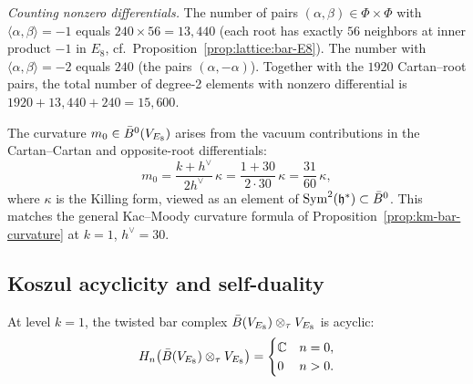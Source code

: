 \begin{computation}
\emph{Counting nonzero differentials.}
The number of pairs $(\alpha, \beta) \in \Phi \times \Phi$ with
$\langle \alpha, \beta \rangle = -1$ equals $240 \times 56 = 13{,}440$
(each root has exactly $56$ neighbors at inner product $-1$ in $E_8$,
cf.\ Proposition~\ref{prop:lattice:bar-E8}).
The number with $\langle \alpha, \beta \rangle = -2$
equals $240$ (the pairs $(\alpha, -\alpha)$).  Together with the $1920$
Cartan--root pairs, the total number of degree-2 elements with nonzero
differential is $1920 + 13{,}440 + 240 = 15{,}600$.
\end{computation}

\begin{computation}
\label{comp:E8-curvature}
The curvature $m_0 \in \bar{B}^0(V_{E_8})$ arises from the vacuum
contributions in the Cartan--Cartan and opposite-root differentials:
\begin{equation}\label{eq:E8-curvature}
m_0 = \frac{k + h^\vee}{2h^\vee}\,\kappa
= \frac{1 + 30}{2 \cdot 30}\,\kappa
= \frac{31}{60}\,\kappa,
\end{equation}
where $\kappa$ is the Killing form, viewed as an element of
$\mathrm{Sym}^2(\mathfrak{h}^*) \subset \bar{B}^0$.
This matches the general Kac--Moody curvature formula
of Proposition~\ref{prop:km-bar-curvature} at $k = 1$, $h^\vee = 30$.
\end{computation}

\subsection{Koszul acyclicity and self-duality}

\begin{proposition}
\label{prop:E8-koszul-acyclic}
At level $k = 1$, the twisted bar complex
$\bar{B}(V_{E_8}) \otimes_\tau V_{E_8}$ is acyclic:
\[
H_n\bigl(\bar{B}(V_{E_8}) \otimes_\tau V_{E_8}\bigr) = \begin{cases}
\mathbb{C} & n = 0, \\
0 & n > 0.
\end{cases}
\]
\end{proposition}


